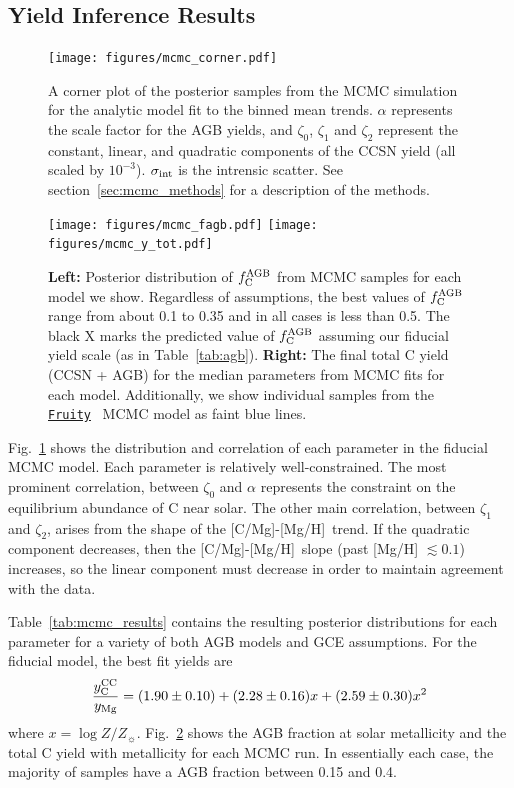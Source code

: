 \documentclass[fleqn,
referee, %
usenatbib]{mnras}
\newcommand{\fruity}{\texttt{\hyperlink{fruity}{Fruity}}}
\newcommand{\zetaobest}{1.90 \pm 0.10}
\newcommand{\zetaibest}{2.28 \pm 0.16}
\newcommand{\zetaiibest}{2.59 \pm 0.30}
\newcommand{\caah}{[C/Mg]-[Mg/H]}
\newcommand{\Ycc}{{y_{\rm C}^{\rm CC}}}
\newcommand{\fagb}{f_{\rm C}^{\rm AGB}}
\newcommand{\zetao}{\zeta_0}
\newcommand{\zetai}{\zeta_{1}}
\newcommand{\zetaii}{\zeta_{2}}
\newcommand{\Zo}{ Z_{\sun}}
\begin{document}
\subsection{Yield Inference Results} \label{sec:mcmc_results}


\begin{figure}
\centering
\texttt{[image: figures/mcmc\_corner.pdf]}
\caption[]{
A corner plot of the posterior samples from the MCMC simulation for the analytic model fit to the binned mean trends.
$\alpha$ represents the scale factor for the AGB yields, and $\zetao$, $\zetai$ and $\zetaii$ represent the constant, linear, and quadratic components of the CCSN yield (all scaled by $10^{-3}$). $\sigma_{\rm int}$ is the intrensic scatter.
See section~\ref{sec:mcmc_methods} for a description of the methods.
}

\label{fig:mcmc}
\end{figure}


\begin{figure}
    \centering
    \texttt{[image: figures/mcmc\_fagb.pdf]}
    \texttt{[image: figures/mcmc\_y\_tot.pdf]}
    
    \caption[]{
        \textbf{Left:} Posterior distribution of $\fagb$ from MCMC samples for each model we show. Regardless of assumptions, the best values of $\fagb$ range from about 0.1 to 0.35 and in all cases is less than 0.5. The black X marks the predicted value of $\fagb$ assuming our fiducial yield scale (as in Table~\ref{tab:agb}).
    \textbf{Right:} The final total C yield (CCSN + AGB) for the median parameters from MCMC fits for each model. Additionally, we show individual samples from the \fruity{} \ MCMC model as faint blue lines.
    }
    
    \label{fig:mcmc_ytot}
\end{figure}



Fig.~\ref{fig:mcmc} shows the distribution and correlation of each parameter in the fiducial MCMC model. Each parameter is relatively well-constrained. The most prominent correlation, between $\zetao$ and $\alpha$ represents the constraint on the equilibrium abundance of C near solar. The other main correlation, between $\zetai$ and $\zetaii$, arises from the shape of the \caah\ trend. If the quadratic component decreases, then the \caah\  slope (past [Mg/H] $\lesssim 0.1$) increases, so the linear component must decrease in order to maintain agreement with the data.

Table~\ref{tab:mcmc_results} contains the resulting posterior distributions for each parameter for a variety of both AGB models and GCE assumptions. 
For the fiducial model, the best fit yields are 
\begin{equation}
    \frac{\Ycc}{y_{\rm Mg}} = (\zetaobest) + (\zetaibest) x + (\zetaiibest) x^2
\end{equation}
where $x = \log Z/\Zo$.
Fig.~\ref{fig:mcmc_ytot} shows the AGB fraction at solar metallicity and the total C yield with metallicity for each MCMC run. 
In essentially each case, the majority of samples have a AGB fraction between 0.15 and 0.4. 
\end{document}
